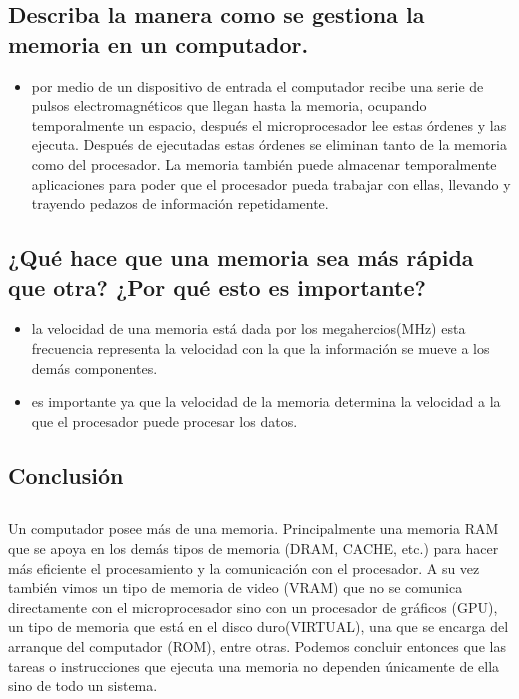 \documentclass{article}
\begin{document}
\subsection{Describa la manera como se gestiona la memoria en un computador.}
    \begin{itemize} \item{}
    por medio de un dispositivo de entrada el computador recibe una serie de pulsos electromagnéticos que llegan hasta la memoria, ocupando temporalmente un espacio, después el microprocesador lee estas órdenes y las ejecuta. Después de ejecutadas estas órdenes se eliminan tanto de la memoria como del procesador. La memoria también puede almacenar temporalmente aplicaciones para poder que el procesador pueda trabajar con ellas, llevando y trayendo pedazos de información repetidamente.\cite{Referencia}
    \end{itemize}

\subsection{¿Qué hace que una memoria sea más rápida que otra? ¿Por qué esto es importante?}
    \begin{itemize} 
    \item{}la velocidad de una memoria está dada por los megahercios(MHz) esta frecuencia representa la velocidad con la que la información se mueve a los demás componentes.\cite{graficas}
    \item{}es importante ya que la velocidad de la memoria determina la velocidad a la que el procesador puede procesar los datos. \cite{graficas}
    \end{itemize}
\pagebreak




    


\begin{center}
    

\section{Conclusión} \label{conclulsion} \end{center}
\subsection{}
Un computador posee más de una memoria. Principalmente una memoria RAM que se apoya en los demás tipos de memoria (DRAM, CACHE, etc.) para hacer más eficiente el procesamiento y la comunicación con el procesador. A su vez también vimos un tipo de memoria de video (VRAM) que no se comunica directamente con el microprocesador sino con un procesador de gráficos (GPU), un tipo de memoria que está en el disco duro(VIRTUAL), una que se encarga del arranque del computador (ROM), entre otras.
\newline
Podemos concluir entonces que las tareas o instrucciones que ejecuta una memoria no dependen únicamente de ella sino de todo un sistema.


\pagebreak



\label{graficas}
\end{document}
